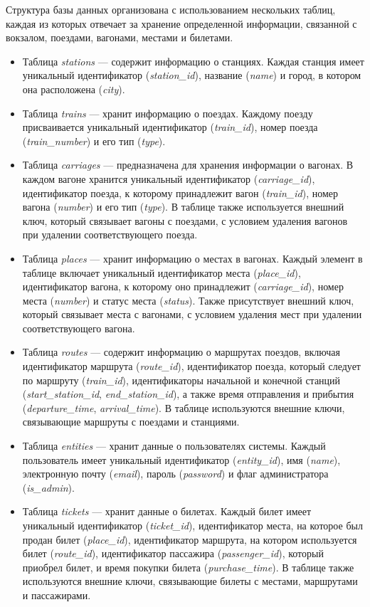   Структура базы данных организована с использованием нескольких таблиц, каждая из которых отвечает за хранение определенной информации, связанной с вокзалом, поездами, вагонами, местами и билетами.

  \begin{itemize}
    \item Таблица \textit{stations} — содержит информацию о станциях. Каждая станция имеет уникальный идентификатор (\textit{station\_id}), название (\textit{name}) и город, в котором она расположена (\textit{city}).
    \item Таблица \textit{trains} — хранит информацию о поездах. Каждому поезду присваивается уникальный идентификатор (\textit{train\_id}), номер поезда (\textit{train\_number}) и его тип (\textit{type}).
    \item Таблица \textit{carriages} — предназначена для хранения информации о вагонах. В каждом вагоне хранится уникальный идентификатор (\textit{carriage\_id}), идентификатор поезда, к которому принадлежит вагон (\textit{train\_id}), номер вагона (\textit{number}) и его тип (\textit{type}). В таблице также используется внешний ключ, который связывает вагоны с поездами, с условием удаления вагонов при удалении соответствующего поезда.
    \item Таблица \textit{places} — хранит информацию о местах в вагонах. Каждый элемент в таблице включает уникальный идентификатор места (\textit{place\_id}), идентификатор вагона, к которому оно принадлежит (\textit{carriage\_id}), номер места (\textit{number}) и статус места (\textit{status}). Также присутствует внешний ключ, который связывает места с вагонами, с условием удаления мест при удалении соответствующего вагона.
    \item Таблица \textit{routes} — содержит информацию о маршрутах поездов, включая идентификатор маршрута (\textit{route\_id}), идентификатор поезда, который следует по маршруту (\textit{train\_id}), идентификаторы начальной и конечной станций (\textit{start\_station\_id}, \textit{end\_station\_id}), а также время отправления и прибытия (\textit{departure\_time}, \textit{arrival\_time}). В таблице используются внешние ключи, связывающие маршруты с поездами и станциями.
    \item Таблица \textit{entities} — хранит данные о пользователях системы. Каждый пользователь имеет уникальный идентификатор (\textit{entity\_id}), имя (\textit{name}), электронную почту (\textit{email}), пароль (\textit{password}) и флаг администратора (\textit{is\_admin}).
    \item Таблица \textit{tickets} — хранит данные о билетах. Каждый билет имеет уникальный идентификатор (\textit{ticket\_id}), идентификатор места, на которое был продан билет (\textit{place\_id}), идентификатор маршрута, на котором используется билет (\textit{route\_id}), идентификатор пассажира (\textit{passenger\_id}), который приобрел билет, и время покупки билета (\textit{purchase\_time}). В таблице также используются внешние ключи, связывающие билеты с местами, маршрутами и пассажирами.
\end{itemize}
